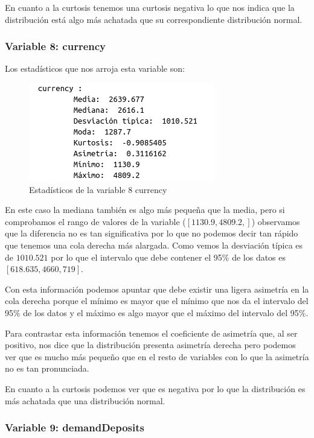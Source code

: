 \documentclass[12pt,a4paper]{article}
\begin{document}
En cuanto a la curtosis tenemos una curtosis negativa lo que nos indica que la distribución está algo más achatada que su correspondiente distribución normal.

\subsubsection*{Variable 8: currency}

Los estadísticos que nos arroja esta variable son:

\begin{figure}[H]
	\centering
	\includegraphics[scale=0.7]{./Imagenes/EDA/Regresion/estadisticos_currency.png}
	\caption{Estadísticos de la variable 8 currency}
\end{figure}

En este caso la mediana también es algo más pequeña que la media, pero si comprobamos el rango de valores de la variable ($[1130.9, 4809.2,]$) observamos que la diferencia no es tan significativa por lo que no podemos decir tan rápido que tenemos una cola derecha más alargada. Como vemos la desviación típica es de $1010.521$ por lo que el intervalo que debe contener el 95\% de los datos es $[618.635,4660,719]$. 

Con esta información podemos apuntar que debe existir una ligera asimetría en la cola derecha porque el mínimo es mayor que el mínimo que nos da el intervalo del 95\% de los datos y el máximo es algo mayor que el máximo del intervalo del 95\%.

Para contrastar esta información tenemos el coeficiente de asimetría que, al ser positivo, nos dice que la distribución presenta asimetría derecha pero podemos ver que es mucho más pequeño que en el resto de variables con lo que la asimetría no es tan pronunciada.

En cuanto a la curtosis podemos ver que es negativa por lo que la distribución es más achatada que una distribución normal.

\subsubsection*{Variable 9: demandDeposits}
\end{document}
